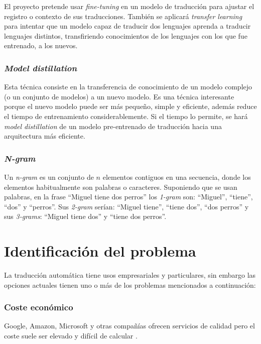 El proyecto pretende usar \textit{fine-tuning} en un modelo de traducción para ajustar el registro
o contexto de sus traducciones. También se aplicará \textit{transfer learning} para intentar que un modelo
capaz de traducir dos lenguajes aprenda a traducir lenguajes distintos, transfiriendo conocimientos de los
lenguajes con los que fue entrenado, a los nuevos.

\subsubsection{\textit{Model distillation}}
Esta técnica consiste en la transferencia de conocimiento de un modelo complejo (o un conjunto de modelos)
a un nuevo modelo.
Es una técnica interesante porque el nuevo modelo puede ser más pequeño, simple y eficiente,
además reduce el tiempo de entrenamiento considerablemente.
Si el tiempo lo permite, se hará \textit{model distillation} de un modelo pre-entrenado de traducción
hacia una arquitectura más eficiente.

\subsubsection{\textit{N-gram}}
Un \textit{n-gram} es un conjunto de $n$ elementos contiguos en una secuencia, donde los elementos habitualmente son palabras o caracteres.
Suponiendo que se usan palabras, en la frase ``Miguel tiene dos perros'' los \textit{1-gram} son: ``Miguel'', ``tiene'', ``dos'' y ``perros''. Sus \textit{2-gram} serían: ``Miguel tiene'', ``tiene dos'', ``dos perros'' y sus \textit{3-grams}: ``Miguel tiene dos'' y ``tiene dos perros''.




\section{Identificación del problema}\label{problem}
La traducción automática tiene usos empresariales y particulares, sin embargo las opciones
actuales tienen uno o más de los problemas mencionados a continuación:

\subsubsection{Coste económico}
Google, Amazon, Microsoft y otras compañías ofrecen servicios de calidad pero el coste
suele ser elevado y difícil de calcular
\cite{GoogleTranslatePricing,AWSTranslatePricing,MicrosoftTranslatePricing}.

